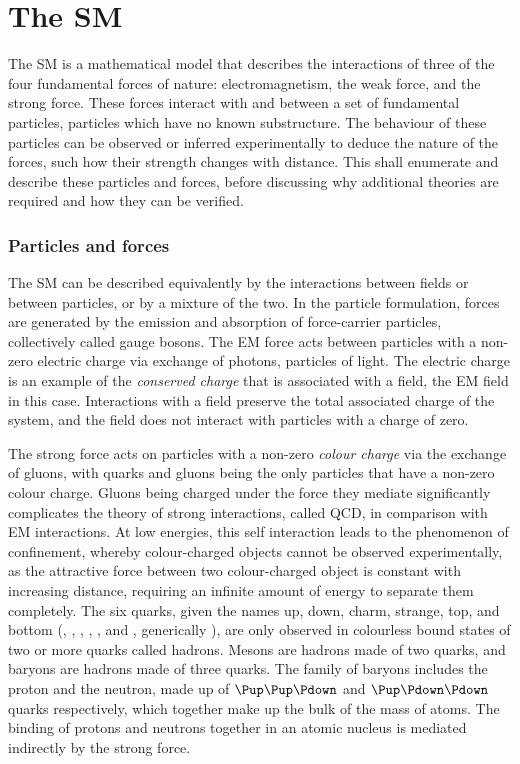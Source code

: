 \chapter{The \acl{SM}}
\label{chap:intro:sm}

The \acf{SM} is a mathematical model that describes the interactions of three 
of the four fundamental forces of nature: electromagnetism, the weak force, and 
the strong force.
These forces interact with and between a set of fundamental particles, 
particles which have no known substructure.
The behaviour of these particles can be observed or inferred experimentally to 
deduce the nature of the forces, such how their strength changes with distance.
This  shall enumerate and describe these particles and 
forces, before discussing why additional theories are required and how they can 
be verified.

\subsection{Particles and forces}

The \ac{SM} can be described equivalently by the interactions between fields or 
between particles, or by a mixture of the two.
In the particle formulation, forces are generated by the emission and 
absorption of force-carrier particles, collectively called gauge bosons.
The \ac{EM} force acts between particles with a non-zero electric charge via 
exchange of photons, particles of light.
The electric charge is an example of the \emph{conserved charge} that is 
associated with a field, the \ac{EM} field in this case.
Interactions with a field preserve the total associated charge of the system, 
and the field does not interact with particles with a charge of zero.

The strong force acts on particles with a non-zero \emph{colour charge} via the 
exchange of gluons, with quarks and gluons being the only particles that have a 
non-zero colour charge.
Gluons being charged under the force they mediate significantly complicates the 
theory of strong interactions, called \ac{QCD}, in comparison with \ac{EM} 
interactions.
At low energies, this self interaction leads to the phenomenon of confinement, 
whereby colour-charged objects cannot be observed experimentally, as the 
attractive force between two colour-charged object is constant with increasing 
distance, requiring an infinite amount of energy to separate them completely.
The six quarks, given the names up, down, charm, strange, top, and bottom 
(\Pup, \Pdown, \Pcharm, \Pstrange, \Ptop, and \Pbottom, generically \Pquark), 
are only observed in colourless bound states of two or more quarks called 
hadrons.
Mesons are hadrons made of two quarks, and baryons are hadrons made of three 
quarks.
The family of baryons includes the proton and the neutron, made up of 
$\Pup\Pup\Pdown$ and $\Pup\Pdown\Pdown$ quarks respectively, which together 
make up the bulk of the mass of atoms.
The binding of protons and neutrons together in an atomic nucleus is mediated 
indirectly by the strong force.

